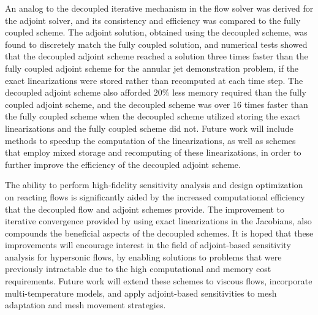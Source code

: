 An analog to the decoupled iterative mechanism in the flow solver was derived
for the adjoint solver, and its consistency and efficiency was compared to the
fully coupled scheme.  The adjoint solution, obtained using the decoupled
scheme, was found to discretely match the fully coupled solution, and numerical
tests showed that the decoupled adjoint scheme reached a solution three times
faster than the fully coupled adjoint scheme for the annular jet demonstration
problem, if the exact linearizations were stored rather than recomputed at each
time step.  The decoupled adjoint scheme also afforded $20\%$ less memory
required than the fully coupled adjoint scheme, and the decoupled scheme was
over 16 times faster than the fully coupled scheme when the decoupled scheme
utilized storing the exact linearizations and the fully coupled scheme did not.
Future work will include methods to speedup the computation of the
linearizations, as well as schemes that employ mixed storage and recomputing of
these linearizations, in order to further improve the efficiency of the
decoupled adjoint scheme.

The ability to perform high-fidelity sensitivity analysis and design
optimization on reacting flows is significantly aided by the increased
computational efficiency that the decoupled flow and adjoint schemes provide.
The improvement to iterative convergence provided by using exact linearizations
in the Jacobians, also compounds the beneficial aspects of the decoupled
schemes.  It is hoped that these improvements will encourage interest in the
field of adjoint-based sensitivity analysis for hypersonic flows, by enabling
solutions to problems that were previously intractable due to the high
computational and memory cost requirements.  Future work will extend these
schemes to viscous flows, incorporate multi-temperature models, and apply
adjoint-based sensitivities to mesh adaptation and mesh movement strategies.
